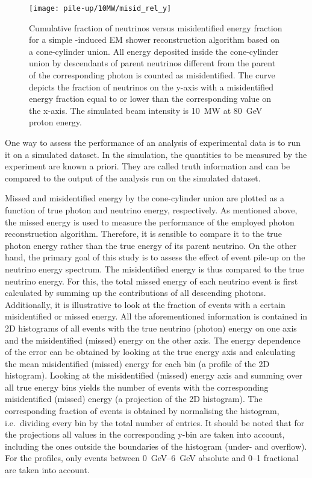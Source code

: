 \begin{figure}[htb]
	\centering
	\texttt{[image: pile-up/10MW/misid\_rel\_y]}
	\caption{Cumulative fraction of neutrinos versus misidentified energy fraction for a simple \Pgpz-induced EM shower reconstruction algorithm based on a cone-cylinder union.
		All energy deposited inside the cone-cylinder union by descendants of parent neutrinos different from the parent of the corresponding \Pgpz photon is counted as misidentified.
		The curve depicts the fraction of neutrinos on the y-axis with a misidentified energy fraction equal to or lower than the corresponding value on the x-axis.
		The simulated beam intensity is \SI{10}{\mega\watt} at \SI{80}{\giga\electronvolt} proton energy.}
	\label{fig:dune-nd_10MW_misid-rel-y}
\end{figure}

One way to assess the performance of an analysis of experimental data is to run it on a simulated dataset.
In the simulation, the quantities to be measured by the experiment are known a priori.
They are called truth information and can be compared to the output of the analysis run on the simulated dataset.

Missed and misidentified energy by the cone-cylinder union are plotted as a function of true photon and neutrino energy, respectively.
As mentioned above, the missed energy is used to measure the performance of the employed photon reconstruction algorithm.
Therefore, it is sensible to compare it to the true photon energy rather than the true energy of its parent neutrino.
On the other hand, the primary goal of this study is to assess the effect of event pile-up on the neutrino energy spectrum.
The misidentified energy is thus compared to the true neutrino energy.
For this, the total missed energy of each neutrino event is first calculated by summing up the contributions of all descending \Pgpz photons.
Additionally, it is illustrative to look at the fraction of events with a certain misidentified or missed energy.
All the aforementioned information is contained in 2D histograms of all events with the true neutrino (photon) energy on one axis and the misidentified (missed) energy on the other axis.
The energy dependence of the error can be obtained by looking at the true energy axis and calculating the mean misidentified (missed) energy for each bin (a profile of the 2D histogram).
Looking at the misidentified (missed) energy axis and summing over all true energy bins yields the number of events with the corresponding misidentified (missed) energy (a projection of the 2D histogram).
The corresponding fraction of events is obtained by normalising the histogram, i.e.\ dividing every bin by the total number of entries.
It should be noted that for the projections all values in the corresponding y-bin are taken into account, including the ones outside the boundaries of the histogram (under- and overflow).
For the profiles, only events between \SIrange{0}{6}{\giga\electronvolt} absolute and \numrange{0}{1} fractional are taken into account.

